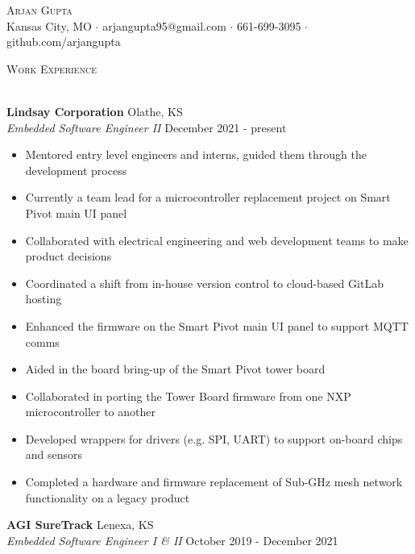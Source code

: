 \documentclass[a4paper]{article}
\newcommand{\lineunder} {
    \vspace*{-8pt} \\
    \hspace*{-18pt} \hrulefill \\
}
\newcommand{\header} [1] {
    {\hspace*{-18pt}\vspace*{6pt} \textsc{#1}}
    \vspace*{-6pt} \lineunder
}
\begin{document}
\vspace*{-40pt}

    

\vspace*{-10pt}
\begin{center}
	{\Huge \scshape {Arjan Gupta}}\\
	Kansas City, MO $\cdot$ arjangupta95@gmail.com $\cdot$ 661-699-3095 $\cdot$ github.com/arjangupta\\
\end{center}

\header{Work Experience}
\vspace{1mm}

\textbf{Lindsay Corporation} \hfill Olathe, KS\\
\textit{Embedded Software Engineer II} \hfill December 2021 - present\\
\vspace{-1mm}
\begin{itemize} \itemsep 1pt
    \item Mentored entry level engineers and interns, guided them through the development process
    \item Currently a team lead for a microcontroller replacement project on Smart Pivot main UI panel
    \item Collaborated with electrical engineering and web development teams to make product decisions
    \item Coordinated a shift from in-house version control to cloud-based GitLab hosting
    \item Enhanced the firmware on the Smart Pivot main UI panel to support MQTT comms
    \item Aided in the board bring-up of the Smart Pivot tower board
    \item Collaborated in porting the Tower Board firmware from one NXP microcontroller to another
    \item Developed wrappers for drivers (e.g. SPI, UART) to support on-board chips and sensors
    \item Completed a hardware and firmware replacement of Sub-GHz mesh network functionality on a legacy product
\end{itemize}
\textbf{AGI SureTrack} \hfill Lenexa, KS\\
\textit{Embedded Software Engineer I \& II} \hfill October 2019 - December 2021\\
\vspace{-1mm}
\end{document}
